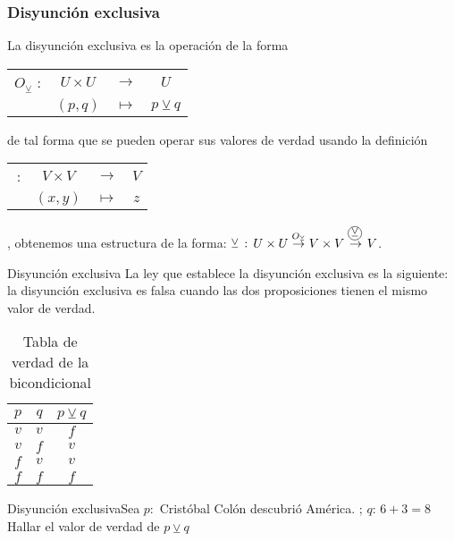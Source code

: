 \subsubsection{Disyunción exclusiva}

La disyunción exclusiva es la operación de la forma %
\begin{tabular}{cccc}
$O_{\veebar}$ : & $U\times U$ & $\rightarrow$ & %
$U$%
\tabularnewline
 & $\left(p,q\right)$ & $\mapsto$ & $p\veebar q$\tabularnewline
\end{tabular}de tal forma que se pueden operar sus valores de verdad usando la
definición %
\begin{tabular}{cccc}
\oper{$\veebar$}\,: & $V\times V$ & $\rightarrow$ & %
$V$%
\tabularnewline
 & $\left(x,y\right)$ & $\mapsto$ & $z$\tabularnewline
\end{tabular}, obtenemos una estructura de la forma: $\veebar\,:\, U\times U\overset{O_{\veebar}}{\rightarrow}V\times V\overset{\oper{\ensuremath{\veebar}}\,}{\rightarrow}V$.

\begin{definicionn}{ Disyunción exclusiva} La ley que establece
la disyunción exclusiva es la siguiente: la disyunción exclusiva es
falsa cuando las dos proposiciones tienen el mismo valor de verdad.\end{definicionn}

\begin{table}[H]
\centering

\caption{Tabla de verdad de la bicondicional}


\setlength\arrayrulewidth{1pt} 

\begin{tabular}{c|c|c}
\arrayrulecolor{ptctitle}\hline\cellcolor{ptctitle!50}$p$ & \cellcolor{ptctitle!50}$q$ & \cellcolor{ptctitle!50}$p\veebar q$\tabularnewline
\hline\cellcolor{ptcbackground}$v$ & \cellcolor{ptcbackground} $v$ & \cellcolor{ptcbackground}$f$\tabularnewline
\hline\cellcolor{gray!50}$v$ & \cellcolor{gray!50} $f$ & \cellcolor{gray!50}$v$\tabularnewline
\hline\cellcolor{ptcbackground}$f$ & \cellcolor{ptcbackground} $v$ & \cellcolor{ptcbackground}$v$\tabularnewline
\hline\cellcolor{gray!50}$f$ & \cellcolor{gray!50} $f$ & \cellcolor{gray!50}$f$\tabularnewline
\end{tabular}
\end{table}


\begin{ejem}{Disyunción exclusiva}Sea $p:$ Cristóbal Colón descubrió
América. ; $q:\,6+3=8$ Hallar el valor de verdad de $p\veebar q$
\end{ejem}

